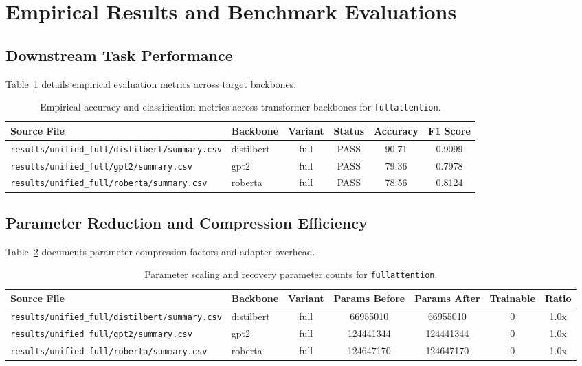 \section{Empirical Results and Benchmark Evaluations}

\subsection{Downstream Task Performance}
Table~\ref{tab:results_acc_fullattention} details empirical evaluation metrics across target backbones.

\begin{table}[t]
\centering
\small
\begin{tabular}{llcccc}
\toprule
\textbf{Source File} & \textbf{Backbone} & \textbf{Variant} & \textbf{Status} & \textbf{Accuracy} & \textbf{F1 Score} \\
\midrule
\texttt{results/unified\_full/distilbert/summary.csv} & distilbert & full & PASS & 90.71 & 0.9099 \\
\texttt{results/unified\_full/gpt2/summary.csv} & gpt2 & full & PASS & 79.36 & 0.7978 \\
\texttt{results/unified\_full/roberta/summary.csv} & roberta & full & PASS & 78.56 & 0.8124 \\
\bottomrule
\end{tabular}
\caption{Empirical accuracy and classification metrics across transformer backbones for \texttt{fullattention}.}
\label{tab:results_acc_fullattention}
\end{table}

\subsection{Parameter Reduction and Compression Efficiency}
Table~\ref{tab:results_params_fullattention} documents parameter compression factors and adapter overhead.

\begin{table}[t]
\centering
\small
\begin{tabular}{llccccc}
\toprule
\textbf{Source File} & \textbf{Backbone} & \textbf{Variant} & \textbf{Params Before} & \textbf{Params After} & \textbf{Trainable} & \textbf{Ratio} \\
\midrule
\texttt{results/unified\_full/distilbert/summary.csv} & distilbert & full & 66955010 & 66955010 & 0 & 1.0x \\
\texttt{results/unified\_full/gpt2/summary.csv} & gpt2 & full & 124441344 & 124441344 & 0 & 1.0x \\
\texttt{results/unified\_full/roberta/summary.csv} & roberta & full & 124647170 & 124647170 & 0 & 1.0x \\
\bottomrule
\end{tabular}
\caption{Parameter scaling and recovery parameter counts for \texttt{fullattention}.}
\label{tab:results_params_fullattention}
\end{table}

